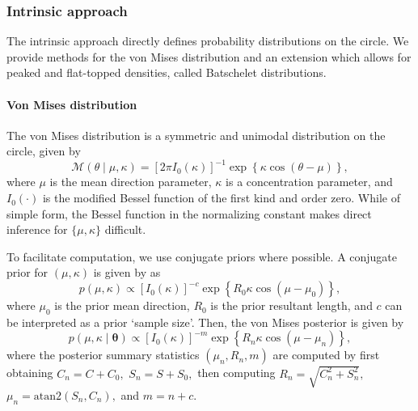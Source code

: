 \hypertarget{intrinsic-approach}{%
\subsubsection{Intrinsic approach}\label{intrinsic-approach}}

\label{sec:intrinsic}

The intrinsic approach directly defines probability distributions on the
circle. We provide methods for the von Mises distribution and an
extension which allows for peaked and flat-topped densities, called
Batschelet distributions.

\hypertarget{von-mises-distribution}{%
\paragraph{Von Mises distribution}\label{von-mises-distribution}}

\label{vonmisespost}

The von Mises distribution is a symmetric and unimodal distribution on
the circle, given by \begin{equation}
\mathcal{M}(\theta \mid \mu, \kappa) = [2 \pi I_0(\kappa)]^{-1} \exp \left\{ \kappa \cos(\theta - \mu) \right\},
\end{equation} where \(\mu\) is the mean direction parameter, \(\kappa\)
is a concentration parameter, and \(I_0(\cdot)\) is the modified Bessel
function of the first kind and order zero. While of simple form, the
Bessel function in the normalizing constant makes direct inference for
\(\{\mu, \kappa\}\) difficult.

To facilitate computation, we use conjugate priors where possible. A
conjugate prior for \((\mu, \kappa)\) is given by
\citet{guttorp1988finding} as \begin{equation} \label{eqn:vmconjprior}
p(\mu, \kappa) \propto [I_0(\kappa)]^{-c}  \exp \left\{ R_0 \kappa \cos(\mu - \mu_0) \right\},
\end{equation} where \(\mu_0\) is the prior mean direction, \(R_0\) is
the prior resultant length, and \(c\) can be interpreted as a prior
`sample size'. Then, the von Mises posterior is given by
\begin{equation}
p(\mu, \kappa \mid \boldsymbol{\theta}) \propto [I_0(\kappa)]^{-m}  \exp \left\{ R_n \kappa \cos(\mu - \mu_n) \right\},
\end{equation} where the posterior summary statistics
\((\mu_n, R_n, m)\) are computed by first obtaining \(C_n = C + C_0,\)
\(S_n = S + S_0,\) then computing \(R_n = \sqrt{C_n^2 + S_n^2},\)
\(\mu_n = \text{atan2}(S_n, C_n),\) and \(m = n + c\).

